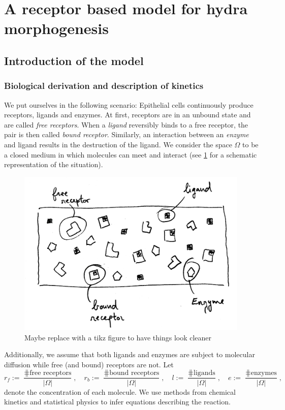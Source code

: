 \section{A receptor based model for hydra morphogenesis}

\subsection{Introduction of the model}

\subsubsection{Biological derivation and description of kinetics}
We put ourselves in the following scenario: Epithelial cells continuously produce receptors, ligands and enzymes. At first, receptors are in an unbound state and are called \textit{free receptors}. When a \textit{ligand} reversibly binds to a free receptor, the pair is then called \textit{bound receptor}. Similarly, an interaction between an \textit{enzyme} and ligand results in the destruction of the ligand. We consider the space $\Omega$ to be a closed medium in which molecules can meet and interact (see \ref{phy_stat} for a schematic representation of the situation). 
\begin{figure}
	\label{phy_stat}
	\includegraphics[width=\linewidth, height=8cm]{figures/epi_scheme.jpeg}
	\caption{Maybe replace with a tikz figure to have things look cleaner}
\end{figure}
Additionally, we assume that both ligands and enzymes are subject to molecular diffusion while free (and bound) receptors are not. Let 
$$r_f := \frac{\hash \text{free receptors}}{|\Omega|}, \quad r_b := \frac{\hash \text{bound receptors}}{|\Omega|}, \quad l := \frac{\hash \text{ligands}}{|\Omega|}, \quad e := \frac{\hash \text{enzymes}}{|\Omega|},$$
denote the concentration of each molecule. We use methods from chemical kinetics and statistical physics to infer equations describing the reaction.

